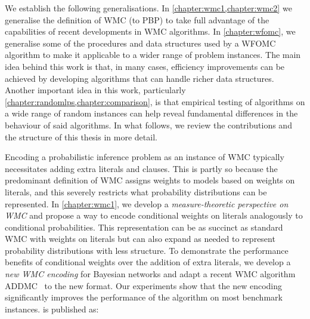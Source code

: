 
We establish the following generalisations. In \cref{chapter:wmc1,chapter:wmc2} we generalise the definition of WMC (to PBP) to take full advantage of the capabilities of recent developments in WMC algorithms. In \cref{chapter:wfomc}, we generalise some of the procedures and data structures used by a WFOMC algorithm to make it applicable to a wider range of problem instances. The main idea behind this work is that, in many cases, efficiency improvements can be achieved by developing algorithms that can handle richer data structures. Another important idea in this work, particularly \cref{chapter:randomlps,chapter:comparison}, is that empirical testing of algorithms on a wide range of random instances can help reveal fundamental differences in the behaviour of said algorithms. In what follows, we review the contributions and the structure of this thesis in more detail.




Encoding a probabilistic inference problem as an instance of WMC typically necessitates adding extra literals and clauses. This is partly so because the predominant definition of WMC assigns weights to models based on weights on literals, and this severely restricts what probability distributions can be represented. In \cref{chapter:wmc1}, we develop a \emph{measure-theoretic perspective on WMC} and propose a way to encode conditional weights on literals analogously to conditional probabilities. This representation can be as succinct as standard WMC with weights on literals but can also expand as needed to represent probability distributions with less structure. To demonstrate the performance benefits of conditional weights over the addition of extra literals, we develop a \emph{new WMC encoding} for Bayesian networks and adapt a recent WMC algorithm \textsf{ADDMC}~\citep{DBLP:conf/aaai/DudekPV20} to the new format. Our experiments show that the new encoding significantly improves the performance of the algorithm on most benchmark instances.  is published as:
\begin{displayquote}
\end{displayquote}

